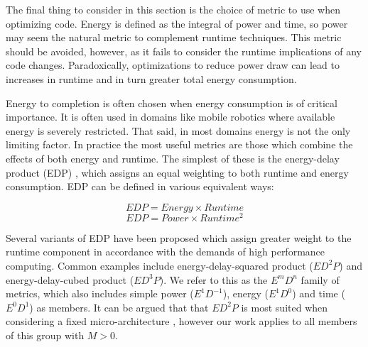 The final thing to consider in this section is the choice of metric to use when optimizing code. Energy is defined as the integral of power and time, so power may seem the natural metric to complement runtime techniques. This metric should be avoided, however, as it fails to consider the runtime implications of any code changes. Paradoxically, optimizations to reduce power draw can lead to increases in runtime and in turn greater total energy consumption.

Energy to completion is often chosen when energy consumption is of critical importance. It is often used in domains like mobile robotics where available energy is severely restricted. That said, in most domains energy is not the only limiting factor. In practice the most useful metrics are those which combine the effects of both energy and runtime. The simplest of these is the energy-delay product (EDP) \cite{gonzales:1995aa}, which assigns an equal weighting to both runtime and energy consumption. EDP can be defined in various equivalent ways:\golden

\begin{equation}
EDP = Energy \times Runtime
\end{equation}
\begin{equation}
\label{eq:edp}
EDP = Power \times Runtime^{2}
\end{equation}

Several variants of EDP have been proposed which assign greater weight to the runtime component in accordance with the demands of high performance computing. Common examples include energy-delay-squared product ($ED^{2}P$) and energy-delay-cubed product ($ED^{3}P$). We refer to this as the $E^mD^n$ family of metrics, which also includes simple power ($E^1D^{-1}$), energy ($E^1D^0$) and time ($E^0D^1$) as members. It can be argued that that $ED^{2}P$ is most suited when considering a fixed micro-architecture \cite{brooks:2000aa}, however our work applies to all members of this group with $M > 0$.
